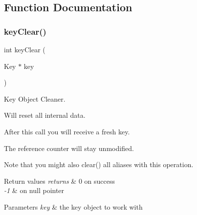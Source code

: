 \subsection{Function Documentation}
\mbox{\label{group__key_gab2242311a36bbc0520e0d36895107ec1}} 
\subsubsection{\texorpdfstring{keyClear()}{keyClear()}}
{\footnotesize\ttfamily int key\+Clear (\begin{DoxyParamCaption}\item[{Key $\ast$}]{key }\end{DoxyParamCaption})}



Key Object Cleaner. 

Will reset all internal data.

After this call you will receive a fresh key.

The reference counter will stay unmodified.

\begin{DoxyNote}{Note}
that you might also clear() all aliases with this operation.
\end{DoxyNote}

\begin{DoxyCode}{0}
\DoxyCodeLine{\{}
\DoxyCodeLine{        \textcolor{comment}{// you have a fresh key k here}}
\DoxyCodeLine{        \textcolor{comment}{// the caller will get an empty key k with an value}}
\DoxyCodeLine{\}}
\end{DoxyCode}



\begin{DoxyRetVals}{Return values}
{\em returns} & 0 on success \\
\hline
{\em -\/1} & on null pointer\\
\hline
\end{DoxyRetVals}

\begin{DoxyParams}{Parameters}
{\em key} & the key object to work with \\
\hline
\end{DoxyParams}
\mbox{\label{group__key_ga6a12cbbe656a1ad9f41b8c681d7a2f92}} 
